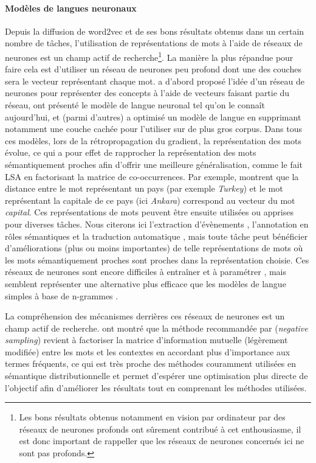 \paragraph{Modèles de langues neuronaux} Depuis la diffusion de word2vec
\citep{mikolov2013distributed} et de ses bons résultats obtenus dans un certain
nombre de tâches, l'utilisation de représentations de mots à l'aide de réseaux
de neurones est un champ actif de recherche\footnote{Les bons résultats obtenus
notamment en vision par ordinateur par des réseaux de neurones profonds ont
sûrement contribué à cet enthousiasme, il est donc important de rappeller que
les réseaux de neurones concernés ici ne sont pas profonds.}.  La manière la
plus répandue pour faire cela est d'utiliser un réseau de neurones peu profond
dont une des couches sera le vecteur représentant chaque mot.
\cite{hinton1986learning} a d'abord proposé l'idée d'un réseau de neurones pour
représenter des concepts à l'aide de vecteurs faisant partie du réseau,
\cite{bengio2001neural,bengio2003neural} ont présenté le modèle de langue
neuronal tel qu'on le connaît aujourd'hui, et \cite{mikolov2013distributed}
(parmi d'autres) a optimisé un modèle de langue en supprimant notamment une
couche cachée pour l'utiliser sur de plus gros corpus. Dans tous ces modèles,
lors de la rétropropagation du gradient, la représentation des mots évolue, ce
qui a pour effet de rapprocher la représentation des mots sémantiquement
proches afin d'offrir une meilleure généralisation, comme le fait LSA en
factorisant la matrice de co-occurrences.  Par exemple,
\cite{mikolov2013distributed} montrent que la distance entre le mot
représentant un pays (par exemple \textit{Turkey}) et le mot représentant la
capitale de ce pays (ici \textit{Ankara}) correspond au vecteur du mot
\textit{capital}.  Ces représentations de mots peuvent être ensuite utilisées ou
apprises pour diverses tâches. Nous citerons ici l'extraction d'évènements
\citep{boros2014etiquetage}, l'annotation en rôles sémantiques
\citep{lechelle2014utilisation} et la traduction automatique
\citep{devlin2014fast}, mais toute tâche peut bénéficier d'améliorations (plus
ou moins importantes) de telle représentations de mots où les mots
sémantiquement proches sont proches dans la représentation choisie.  Ces
réseaux de neurones sont encore difficiles à entraîner et à paramétrer
\citep{do2014modeles}, mais semblent représenter une alternative plus efficace
que les modèles de langue simples à base de n-grammes \citep{baroni2014dont}.

La compréhension des mécanismes derrières ces réseaux de neurones est un champ
actif de recherche. \cite{levy2014neural} ont montré que la méthode recommandée
par \cite{mikolov2013distributed} (\textit{negative sampling}) revient à
factoriser la matrice d'information mutuelle (légèrement modifiée) entre les
mots et les contextes en accordant plus d'importance aux termes fréquents, ce
qui est très proche des méthodes couramment utilisées en sémantique
distributionnelle et permet d'espérer une optimisation plus directe de
l'objectif afin d'améliorer les résultats tout en comprenant les méthodes
utilisées.

